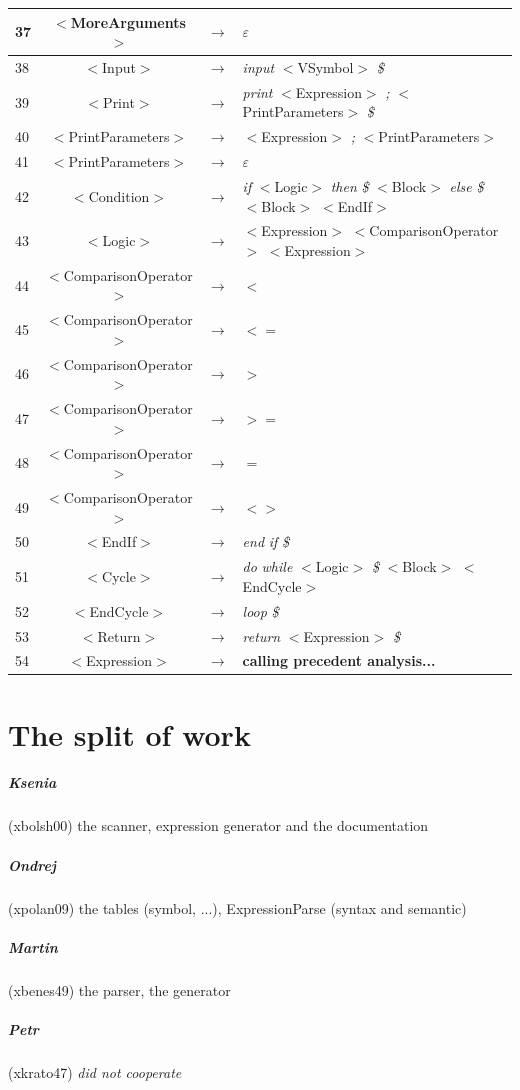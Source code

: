 \documentclass[10pt,a4paper,titlepage]{article}
\begin{document}
{\begin{center}
\begin{tabular}{ | l | c  c  l | }
      37 & $<$MoreArguments$>$            & $\rightarrow$ & $\varepsilon$ \\ \hline
      38 & $<$Input$>$                    & $\rightarrow$ & {\it input} $<$VSymbol$>$ {\it \$} \\ \hline
      39 & $<$Print$>$                    & $\rightarrow$ & {\it print} $<$Expression$>$ {\it ;} $<$PrintParameters$>$ {\it \$} \\ \hline
      40 & $<$PrintParameters$>$          & $\rightarrow$ & $<$Expression$>$ {\it ;} $<$PrintParameters$>$ \\ \hline
      41 & $<$PrintParameters$>$          & $\rightarrow$ & $\varepsilon$ \\ \hline
      42 & $<$Condition$>$                & $\rightarrow$ & {\it if} $<$Logic$>$ {\it then} {\it \$} $<$Block$>$ {\it else} {\it \$} $<$Block$>$ $<$EndIf$>$ \\ \hline
      43 & $<$Logic$>$                    & $\rightarrow$ & $<$Expression$>$ $<$ComparisonOperator$>$ $<$Expression$>$ \\ \hline
      44 & $<$ComparisonOperator$>$       & $\rightarrow$ & {\it $<$} \\ \hline
      45 & $<$ComparisonOperator$>$       & $\rightarrow$ & {\it $<=$} \\ \hline
      46 & $<$ComparisonOperator$>$       & $\rightarrow$ & {\it $>$} \\ \hline
      47 & $<$ComparisonOperator$>$       & $\rightarrow$ & {\it $>=$} \\ \hline
      48 & $<$ComparisonOperator$>$       & $\rightarrow$ & {\it $=$} \\ \hline
      49 & $<$ComparisonOperator$>$       & $\rightarrow$ & {\it $<>$} \\ \hline
      50 & $<$EndIf$>$                    & $\rightarrow$ & {\it end} {\it if} {\it \$} \\ \hline
      51 & $<$Cycle$>$                    & $\rightarrow$ & {\it do} {\it while} $<$Logic$>$ {\it \$} $<$Block$>$ $<$EndCycle$>$ \\ \hline
      52 & $<$EndCycle$>$                 & $\rightarrow$ & {\it loop} {\it \$} \\ \hline
      53 & $<$Return$>$                   & $\rightarrow$ & {\it return} $<$Expression$>$ {\it \$} \\ \hline
      54 & $<$Expression$>$               & $\rightarrow$ & {\bf calling precedent analysis...} \\ \hline
    \end{tabular}
  \end{center}
}

\newpage

\section{The split of work}
\subparagraph{Ksenia} (xbolsh00) the scanner, expression generator and the documentation
\subparagraph{Ondrej} (xpolan09) the tables (symbol, ...), ExpressionParse (syntax and semantic)
\subparagraph{Martin} (xbenes49) the parser, the generator
\subparagraph{Petr} (xkrato47) {\it did not cooperate}
\end{document}
